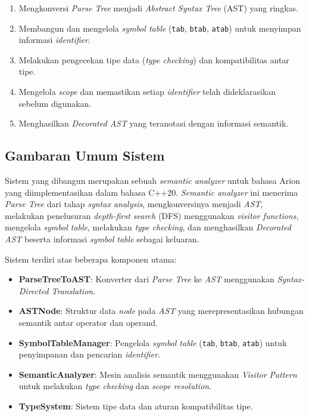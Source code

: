 ﻿\documentclass[12pt,a4paper]{article}
\begin{document}
\begin{enumerate}[label=\arabic*.]
  \item Mengkonversi \textit{Parse Tree} menjadi \textit{Abstract Syntax Tree} (AST) yang ringkas.
  \item Membangun dan mengelola \textit{symbol table} (\texttt{tab}, \texttt{btab}, \texttt{atab}) untuk menyimpan informasi \textit{identifier}.
  \item Melakukan pengecekan tipe data (\textit{type checking}) dan kompatibilitas antar tipe.
  \item Mengelola \textit{scope} dan memastikan setiap \textit{identifier} telah dideklarasikan sebelum digunakan.
  \item Menghasilkan \textit{Decorated AST} yang teranotasi dengan informasi semantik.
\end{enumerate}

\subsection{Gambaran Umum Sistem}

Sistem yang dibangun merupakan sebuah \textit{semantic analyzer} untuk bahasa Arion yang diimplementasikan dalam bahasa C++20. \textit{Semantic analyzer} ini menerima \textit{Parse Tree} dari tahap \textit{syntax analysis}, mengkonversinya menjadi \textit{AST}, melakukan penelusuran \textit{depth-first search} (DFS) menggunakan \textit{visitor functions}, mengelola \textit{symbol table}, melakukan \textit{type checking}, dan menghasilkan \textit{Decorated AST} beserta informasi \textit{symbol table} sebagai keluaran.

Sistem terdiri atas beberapa komponen utama:

\begin{itemize}
  \item \textbf{ParseTreeToAST}: Konverter dari \textit{Parse Tree} ke \textit{AST} menggunakan \textit{Syntax-Directed Translation}.
  \item \textbf{ASTNode}: Struktur data \textit{node} pada \textit{AST} yang merepresentasikan hubungan semantik antar operator dan operand.
  \item \textbf{SymbolTableManager}: Pengelola \textit{symbol table} (\texttt{tab}, \texttt{btab}, \texttt{atab}) untuk penyimpanan dan pencarian \textit{identifier}.
  \item \textbf{SemanticAnalyzer}: Mesin analisis semantik menggunakan \textit{Visitor Pattern} untuk melakukan \textit{type checking} dan \textit{scope resolution}.
  \item \textbf{TypeSystem}: Sistem tipe data dan aturan kompatibilitas tipe.
\end{itemize}
\end{document}
